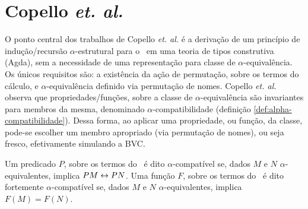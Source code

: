 \section{Copello \textit{et. al.}}\label{sec:copello}
O ponto central dos trabalhos de Copello \textit{et. al.} \cite{Copello2016,Copello2018} é a derivação de um princípio de indução/recursão $\alpha$-estrutural para o \lcalc~em uma teoria de tipos construtiva (Agda), sem a necessidade de uma representação para classe de $\alpha$-equivalência. Os únicos requisitos são: a existência da ação de permutação, sobre os termos do cálculo, e $\alpha$-equivalência definido via permutação de nomes.  Copello \textit{et. al.} observa que propriedades/funções, sobre a classe de $\alpha$-equivalência são invariantes para membros da mesma, denominado $\alpha$-compatibilidade (definição \ref{def:alpha-compatibilidade}). Dessa forma, ao aplicar uma propriedade, ou função, da classe, pode-se escolher um membro apropriado (via permutação de nomes), ou seja fresco, efetivamente simulando a BVC.
\begin{definicao}\label{def:alpha-compatibilidade}
Um predicado $P$, sobre os termos do \lcalc~é dito $\alpha$-compatível se, dados $M$ e $N$ $\alpha$-equivalentes, implica $P M \leftrightarrow P N$.
Uma função $F$, sobre os termos do \lcalc~é dito fortemente $\alpha$-compatível se, dados $M$ e $N$ $\alpha$-equivalentes, implica $F(M) = F(N)$.
\end{definicao}

